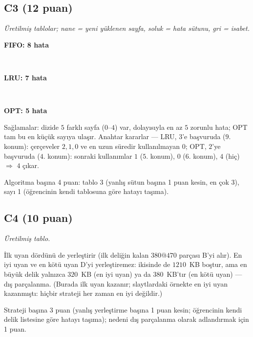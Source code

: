 \documentclass[11pt,a4paper]{article}
\begin{document}
\subsection*{C3 (12 puan)}
\textit{Üretilmiş tablolar; nane = yeni yüklenen sayfa, soluk = hata sütunu, gri = isabet.}
\begin{center}
\begin{minipage}{\linewidth}\centering\textbf{FIFO: 8 hata}\\[0.2em]\end{minipage}\\[0.8em]
\begin{minipage}{\linewidth}\centering\textbf{LRU: 7 hata}\\[0.2em]\end{minipage}\\[0.8em]
\begin{minipage}{\linewidth}\centering\textbf{OPT: 5 hata}\\[0.2em]\end{minipage}
\end{center}
Sağlamalar: dizide $5$ farklı sayfa ($0$--$4$) var, dolayısıyla en az $5$ zorunlu hata; OPT tam bu en küçük sayıya ulaşır. Anahtar kararlar --- LRU, $3$'e başvuruda ($9$. konum): çerçeveler $2, 1, 0$ ve en uzun süredir kullanılmayan $0$; OPT, $2$'ye başvuruda ($4$. konum): sonraki kullanımlar $1$ ($5$. konum), $0$ ($6$. konum), $4$ (hiç) $\Rightarrow$ $4$ çıkar.
\begin{rubric}Algoritma başına 4 puan: tablo 3 (yanlış sütun başına 1 puan kesin, en çok 3), sayı 1 (öğrencinin kendi tablosuna göre hatayı taşıma).\end{rubric}

\subsection*{C4 (10 puan)}
\textit{Üretilmiş tablo.}
\begin{center}\small{}\end{center}
İlk uyan dördünü de yerleştirir (ilk deliğin kalan $380@470$ parçası B'yi alır). En iyi uyan ve en kötü uyan D'yi yerleştiremez: ikisinde de $1210$~KB boştur, ama en büyük delik yalnızca $320$~KB (en iyi uyan) ya da $380$~KB'tır (en kötü uyan) --- dış parçalanma. (Burada ilk uyan kazanır; slaytlardaki örnekte en iyi uyan kazanmıştı: hiçbir strateji her zaman en iyi değildir.)
\begin{rubric}Strateji başına 3 puan (yanlış yerleştirme başına 1 puan kesin; öğrencinin kendi delik listesine göre hatayı taşıma); nedeni dış parçalanma olarak adlandırmak için 1 puan.\end{rubric}
\end{document}
